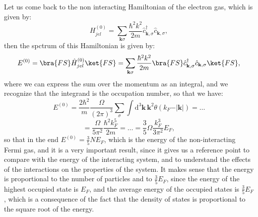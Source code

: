 Let us come back to the non interacting Hamiltonian of the electron gas, which is given by:
\[
    H_{jel}^{(0)} = \sum_{\mathbf{k} \sigma} \frac{\hbar^2 k^2}{2m} \hat{c}_{\mathbf{k}, \sigma}^\dagger \hat{c}_{\mathbf{k}, \sigma},
\]
then the spctrum of this Hamiltonian is given by:
\[
    E^{(0)} = \bra{FS} \hat{H}_{jel}^{(0)} \ket{FS} = \sum_{\mathbf{k} \sigma} \frac{\hbar^2 k^2}{2m} \bra{FS} \hat{c}_{\mathbf{k}, \sigma}^\dagger \hat{c}_{\mathbf{k}, \sigma} \ket{FS},
\]
where we can express the sum over the momentum as an integral, and we recognize that the integrand is the occupation number, so that we have:
\[
    E^{(0)} = \frac{2\hbar^2}{m} \frac{\Omega}{(2\pi)^3} \sum_{\sigma} \int \mathrm{d}^3 \mathbf{k} \, \mathbf{k}^2 \theta(k_F - \vert \mathbf{k} \vert ) = \dots
\]
\[
    = \frac{\Omega}{5 \pi^2} \frac{\hbar^2 k_F^5}{2m} = \dots = \frac{3}{5} \Omega \frac{k_F^3}{3 \pi^2} E_F,
\]
so that in the end \(E^{(0)} = \frac{3}{5} N E_F\), which is the energy of the non-interacting Fermi gas, and it is a very important result, since it gives us a reference point to compare with the energy of the interacting system, and to understand the effects of the interactions on the properties of the system. It makes sense that the energy is proportional to the number of particles and to \(\frac{3}{5} E_F\), since the energy of the highest occupied state is \(E_F\), and the average energy of the occupied states is \(\frac{3}{5} E_F\), which is a consequence of the fact that the density of states is proportional to the square root of the energy.

